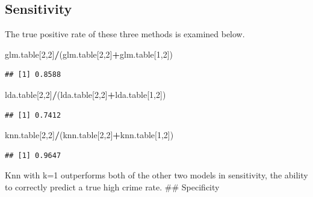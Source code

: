 \documentclass[
]{article}
\newenvironment{Shaded}{\begin{snugshade}}{\end{snugshade}}
\newcommand{\DecValTok}[1]{\textcolor[rgb]{0.00,0.00,0.81}{#1}}
\newcommand{\NormalTok}[1]{#1}
\newcommand{\OperatorTok}[1]{\textcolor[rgb]{0.81,0.36,0.00}{\textbf{#1}}}
\begin{document}
\hypertarget{sensitivity}{%
\subsection{Sensitivity}\label{sensitivity}}

The true positive rate of these three methods is examined below.

\begin{Shaded}
\begin{Highlighting}[]
\NormalTok{glm.table[}\DecValTok{2}\NormalTok{,}\DecValTok{2}\NormalTok{]}\OperatorTok{/}\NormalTok{(glm.table[}\DecValTok{2}\NormalTok{,}\DecValTok{2}\NormalTok{]}\OperatorTok{+}\NormalTok{glm.table[}\DecValTok{1}\NormalTok{,}\DecValTok{2}\NormalTok{])}
\end{Highlighting}
\end{Shaded}

\begin{verbatim}
## [1] 0.8588
\end{verbatim}

\begin{Shaded}
\begin{Highlighting}[]
\NormalTok{lda.table[}\DecValTok{2}\NormalTok{,}\DecValTok{2}\NormalTok{]}\OperatorTok{/}\NormalTok{(lda.table[}\DecValTok{2}\NormalTok{,}\DecValTok{2}\NormalTok{]}\OperatorTok{+}\NormalTok{lda.table[}\DecValTok{1}\NormalTok{,}\DecValTok{2}\NormalTok{])}
\end{Highlighting}
\end{Shaded}

\begin{verbatim}
## [1] 0.7412
\end{verbatim}

\begin{Shaded}
\begin{Highlighting}[]
\NormalTok{knn.table[}\DecValTok{2}\NormalTok{,}\DecValTok{2}\NormalTok{]}\OperatorTok{/}\NormalTok{(knn.table[}\DecValTok{2}\NormalTok{,}\DecValTok{2}\NormalTok{]}\OperatorTok{+}\NormalTok{knn.table[}\DecValTok{1}\NormalTok{,}\DecValTok{2}\NormalTok{])}
\end{Highlighting}
\end{Shaded}

\begin{verbatim}
## [1] 0.9647
\end{verbatim}

Knn with k=1 outperforms both of the other two models in sensitivity,
the ability to correctly predict a true high crime rate. \#\#
Specificity
\end{document}
